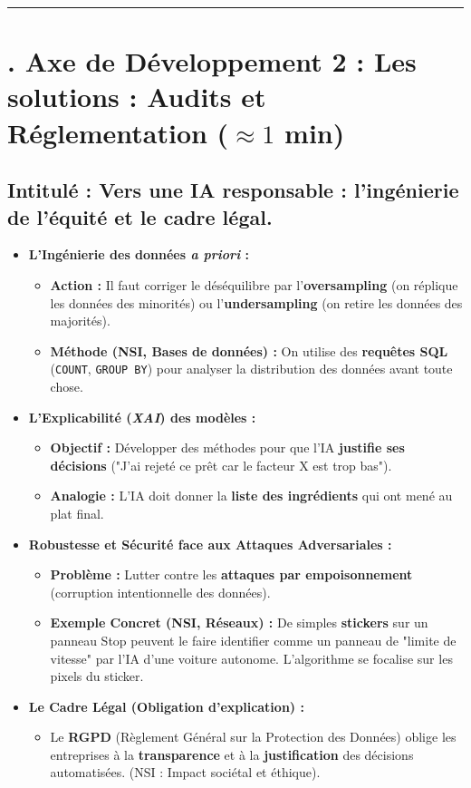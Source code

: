 \hrule

\section*{. Axe de Développement 2 : Les solutions : Audits et Réglementation ($\approx 1$ min)}
\subsection*{Intitulé : Vers une IA responsable : l'ingénierie de l'équité et le cadre légal.}
\begin{itemize}[label=$\diamond$]
    \item \textbf{L'Ingénierie des données \emph{a priori} :}
    \begin{itemize}[label=\textendash]
        \item \textbf{Action :} Il faut corriger le déséquilibre par l'\textbf{oversampling} (on réplique les données des minorités) ou l'\textbf{undersampling} (on retire les données des majorités).
        \item \textbf{Méthode (NSI, Bases de données) :} On utilise des \textbf{requêtes SQL} (\texttt{COUNT}, \texttt{GROUP BY}) pour analyser la distribution des données avant toute chose.
    \end{itemize}
    \item \textbf{L'Explicabilité (\emph{XAI}) des modèles :}
    \begin{itemize}[label=\textendash]
        \item \textbf{Objectif :} Développer des méthodes pour que l'IA \textbf{justifie ses décisions} ("J'ai rejeté ce prêt car le facteur X est trop bas").
        \item \textbf{Analogie : } L'IA doit donner la \textbf{liste des ingrédients} qui ont mené au plat final.
    \end{itemize}
    \item \textbf{Robustesse et Sécurité face aux Attaques Adversariales :}
    \begin{itemize}[label=\textendash]
        \item \textbf{Problème :} Lutter contre les \textbf{attaques par empoisonnement} (corruption intentionnelle des données).
        \item \textbf{Exemple Concret (NSI, Réseaux) :} De simples \textbf{stickers} sur un panneau Stop peuvent le faire identifier comme un panneau de "limite de vitesse" par l'IA d'une voiture autonome. L'algorithme se focalise sur les pixels du sticker.
    \end{itemize}
    \item \textbf{Le Cadre Légal (Obligation d'explication) :}
    \begin{itemize}[label=\textendash]
        \item Le \textbf{RGPD} (Règlement Général sur la Protection des Données) oblige les entreprises à la \textbf{transparence} et à la \textbf{justification} des décisions automatisées. (NSI : Impact sociétal et éthique).
    \end{itemize}
\end{itemize}

